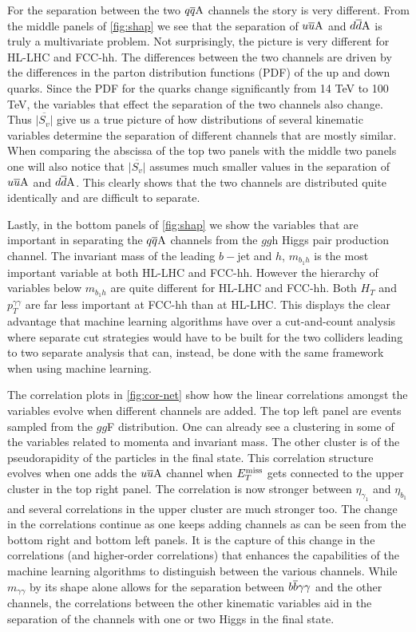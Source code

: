 For the separation between the two $q\overline q \rm A$ channels the story is very different. From the middle panels of \autoref{fig:shap} we see that the separation of $u\overline u \rm A$ and $d\overline d \rm A$ is truly a multivariate problem. Not surprisingly, the picture is very different for HL-LHC and FCC-hh. The differences between the two channels are driven by the differences in the parton distribution functions (PDF) of the up and down quarks. Since the PDF for the quarks change significantly from 14 TeV to 100 TeV, the variables that effect the separation of the two channels also change. Thus $\overline{|S_v|}$ give us a true picture of how distributions of several kinematic variables determine the separation of different channels that are mostly similar. When comparing the abscissa of the top two panels with the middle two panels one will also notice that $\overline{|S_v|}$ assumes much smaller values in the separation of $u\overline u \rm A$ and $d\overline d \rm A$. This clearly shows that the two channels are distributed quite identically and are difficult to separate.

Lastly, in the bottom panels of \autoref{fig:shap} we show the variables that are important in separating the $q\overline q \rm A$ channels from the $gg$h Higgs pair production channel. The invariant mass of the leading $b-$jet and $h$, $m_{b_1h}$ is the most important variable at both HL-LHC and FCC-hh. However the hierarchy of variables below $m_{b_1h}$ are quite different for HL-LHC and FCC-hh. Both $H_T$ and $p_T^{\gamma\gamma}$ are far less important at FCC-hh than at HL-LHC. This displays the clear advantage that machine learning algorithms have over a cut-and-count analysis where separate cut strategies would have to be built for the two colliders leading to two separate analysis that can, instead, be done with the same framework when using machine learning.

The correlation plots in \autoref{fig:cor-net} show how the linear correlations amongst the variables evolve when different channels are added. The top left panel are events sampled from the $gg$F distribution. One can already see a clustering in some of the variables related to momenta and invariant mass. The other cluster is of the pseudorapidity of the particles in the final state. This correlation structure evolves when one adds the $u\overline u \rm A$ channel when $E_T^{\rm miss}$ gets connected to the upper cluster in the top right panel. The correlation is now stronger between $\eta_{\gamma_1}$ and $\eta_{b_1}$ and several correlations in the upper cluster are much stronger too. The change in the correlations continue as one keeps adding channels as can be seen from the bottom right and bottom left panels. It is the capture of this change in the correlations (and higher-order correlations) that enhances the capabilities of the machine learning algorithms to distinguish between the various channels. While $m_{\gamma\gamma}$ by its shape alone allows for the separation between $b\overline b\gamma\gamma$ and the other channels, the correlations between the other kinematic variables aid in the separation of the channels with one or two Higgs in the final state. 




